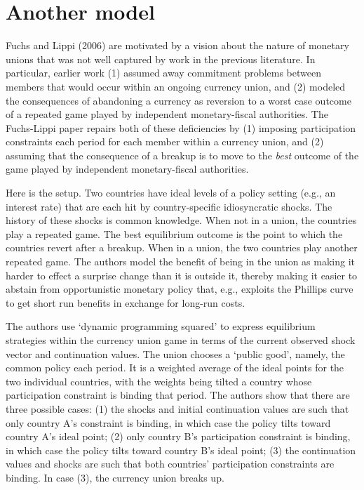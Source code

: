 \section{Another model}
Fuchs and Lippi (2006) are  motivated by a vision  about the nature of monetary unions that was not well captured by work in the previous literature.
In particular, earlier work (1) assumed away commitment problems between members  that would occur within  an ongoing currency union, and (2)
modeled the consequences of abandoning a currency  as reversion to a worst case outcome of a repeated game played by independent monetary-fiscal
authorities.  The Fuchs-Lippi paper repairs both of these deficiencies by (1) imposing participation constraints each period for each member within
a currency union, and   (2) assuming that the consequence of a breakup is to move to the {\it best\/} outcome of the game played by independent monetary-fiscal authorities.

Here is the setup. Two countries have ideal levels of a policy setting (e.g., an interest rate) that are each hit by country-specific
idiosyncratic shocks.  The history of these shocks is common knowledge.  When not in a union, the countries play a repeated game. The best
equilibrium outcome is the point to which the countries  revert after a breakup. When in a union, the two countries play another repeated game.  The authors
model the benefit of being in the union as making it harder to effect a surprise change than it is outside it, thereby making it easier to abstain
from opportunistic monetary policy that, e.g., exploits the Phillips curve to get short run benefits in exchange for long-run costs.
%
%

The authors use `dynamic programming squared' to express  equilibrium strategies within the currency union game in terms of the current observed shock vector
and continuation values. The union  chooses a `public good', namely, the common policy each period.
It is a weighted average of the ideal points for the two
individual countries, with the weights being tilted a country whose participation constraint is binding that period.  The authors show that there
are three possible cases: (1) the shocks and initial continuation values are such that only country A's constraint is binding, in which case the policy tilts toward country A's ideal point;
(2) only country B's participation constraint is binding, in which case the policy tilts toward country B's ideal point; (3) the continuation values
and shocks are such that both countries' participation constraints are binding.  In case (3), the currency union breaks up.

